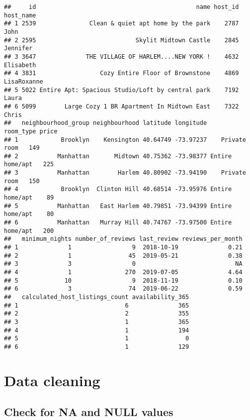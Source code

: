 \documentclass[
]{article}
\begin{document}
\begin{verbatim}
##     id                                             name host_id   host_name
## 1 2539               Clean & quiet apt home by the park    2787        John
## 2 2595                            Skylit Midtown Castle    2845    Jennifer
## 3 3647              THE VILLAGE OF HARLEM....NEW YORK !    4632   Elisabeth
## 4 3831                  Cozy Entire Floor of Brownstone    4869 LisaRoxanne
## 5 5022 Entire Apt: Spacious Studio/Loft by central park    7192       Laura
## 6 5099        Large Cozy 1 BR Apartment In Midtown East    7322       Chris
##   neighbourhood_group neighbourhood latitude longitude       room_type price
## 1            Brooklyn    Kensington 40.64749 -73.97237    Private room   149
## 2           Manhattan       Midtown 40.75362 -73.98377 Entire home/apt   225
## 3           Manhattan        Harlem 40.80902 -73.94190    Private room   150
## 4            Brooklyn  Clinton Hill 40.68514 -73.95976 Entire home/apt    89
## 5           Manhattan   East Harlem 40.79851 -73.94399 Entire home/apt    80
## 6           Manhattan   Murray Hill 40.74767 -73.97500 Entire home/apt   200
##   minimum_nights number_of_reviews last_review reviews_per_month
## 1              1                 9  2018-10-19              0.21
## 2              1                45  2019-05-21              0.38
## 3              3                 0                            NA
## 4              1               270  2019-07-05              4.64
## 5             10                 9  2018-11-19              0.10
## 6              3                74  2019-06-22              0.59
##   calculated_host_listings_count availability_365
## 1                              6              365
## 2                              2              355
## 3                              1              365
## 4                              1              194
## 5                              1                0
## 6                              1              129
\end{verbatim}

\hypertarget{data-cleaning}{%
\section{Data cleaning}\label{data-cleaning}}

\hypertarget{check-for-na-and-null-values}{%
\subsection{Check for NA and NULL
values}\label{check-for-na-and-null-values}}
\end{document}
